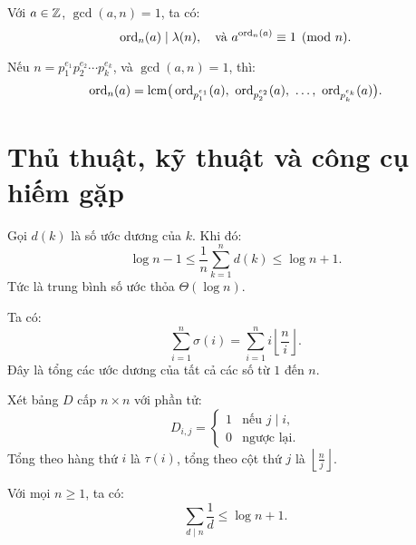 \documentclass[../imo-training-open-book.tex]{subfiles}
\begin{document}
\begin{theorem}
    \label{theorem:order-modulo-composite}
    Với \( a \in \mathbb Z \), \( \gcd(a, n) = 1 \), ta có:
    \[
        \operatorname{ord}_n(a) \mid \lambda(n), \quad \text{và } a^{\operatorname{ord}_n(a)} \equiv 1 \pmod{n}.
    \]
\end{theorem}

\vspace{1em}

\begin{lemma}
    \label{lemma:order-lcm-crt}
    Nếu \( n = p_1^{e_1} p_2^{e_2} \cdots p_k^{e_k} \), và \( \gcd(a, n) = 1 \), thì:
    \[
        \ord_n(a) = \mathrm{lcm}\big(\ord_{p_1^{e_1}}(a),\ \ord_{p_2^{e_2}}(a),\ \dots,\ \ord_{p_k^{e_k}}(a)\big).
    \]
\end{lemma}

\newpage

\section{Thủ thuật, kỹ thuật và công cụ hiếm gặp}

\begin{theorem}
    \label{theorem:average-tau}
    Gọi \( d(k) \) là số ước dương của \( k \). Khi đó:
    \[
        \log n - 1 \le \frac{1}{n} \sum_{k=1}^n d(k) \le \log n + 1.
    \]
    Tức là trung bình số ước thỏa \( \Theta(\log n) \).
\end{theorem}

\vspace{1em}

\begin{theorem}
    \label{theorem:sum-of-divisors-table}
    Ta có:
    \[
        \sum_{i=1}^{n} \sigma(i) = \sum_{i=1}^{n} i \left\lfloor \frac{n}{i} \right\rfloor.
    \]
    Đây là tổng các ước dương của tất cả các số từ \( 1 \) đến \( n \).
\end{theorem}

\vspace{1em}

\begin{theorem}
    \label{theorem:divisor-matrix}
    Xét bảng \( D \) cấp \( n \times n \) với phần tử:
    \[
        D_{i,j} = 
        \begin{cases}
            1 & \text{nếu } j \mid i, \\
            0 & \text{ngược lại}.
        \end{cases}
    \]
    Tổng theo hàng thứ \( i \) là \( \tau(i) \), tổng theo cột thứ \( j \) là \( \left\lfloor \frac{n}{j} \right\rfloor \).
\end{theorem}

\vspace{1em}

\begin{theorem}
    \label{theorem:sum-of-divisors-harmonic}
    Với mọi \( n \ge 1 \), ta có:
    \[
        \sum_{d \mid n} \frac{1}{d} \le \log n + 1.
    \]
\end{theorem}
\end{document}
